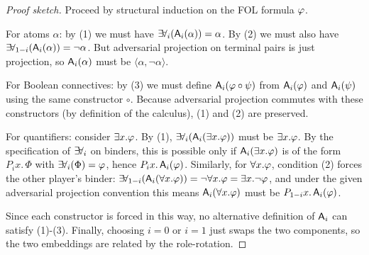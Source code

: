\begin{proof}[Proof sketch]
Proceed by structural induction on the FOL formula $\varphi$.

For atoms $\alpha$: by (1) we must have $\mathop{\exists\!\forall}_i(\mathsf{A}_i(\alpha)) = \alpha$.
By (2) we must also have $\mathop{\exists\!\forall}_{1-i}(\mathsf{A}_i(\alpha)) = \neg \alpha$.
But adversarial projection on terminal pairs is just projection, so $\mathsf{A}_i(\alpha)$ must be
$\langle \alpha, \neg \alpha\rangle$.

For Boolean connectives: by (3) we must define
$\mathsf{A}_i(\varphi \circ \psi)$ from $\mathsf{A}_i(\varphi)$ and $\mathsf{A}_i(\psi)$ using
the same constructor $\circ$. Because adversarial projection commutes with these
constructors (by definition of the calculus), (1) and (2) are preserved.

For quantifiers: consider $\exists x.\varphi$.
By (1), $\mathop{\exists\!\forall}_i(\mathsf{A}_i(\exists x.\varphi))$ must be $\exists x.\varphi$.
By the specification of $\mathop{\exists\!\forall}_i$ on binders, this is possible only if
$\mathsf{A}_i(\exists x.\varphi)$ is of the form $P_i x.\,\Phi$ with
$\mathop{\exists\!\forall}_i(\Phi)=\varphi$, hence $P_i x.\,\mathsf{A}_i(\varphi)$.
Similarly, for $\forall x.\varphi$, condition (2) forces the other player’s binder:
$\mathop{\exists\!\forall}_{1-i}(\mathsf{A}_i(\forall x.\varphi)) = \neg \forall x.\varphi
= \exists x.\neg \varphi$, and under the given adversarial projection convention this means
$\mathsf{A}_i(\forall x.\varphi)$ must be $P_{1-i} x.\,\mathsf{A}_i(\varphi)$.

Since each constructor is forced in this way, no alternative definition of
$\mathsf{A}_i$ can satisfy (1)-(3). Finally, choosing $i=0$ or $i=1$ just swaps the
two components, so the two embeddings are related by the role-rotation.
\end{proof}

